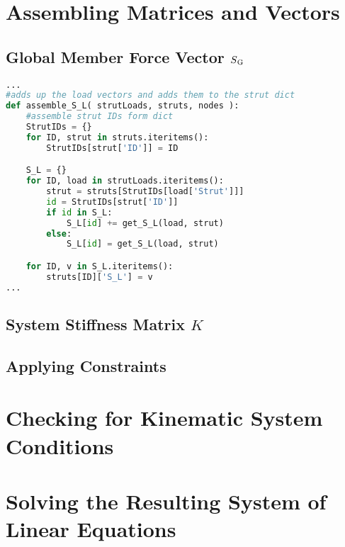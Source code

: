 \section{Assembling Matrices and Vectors}
\label{sec:asmmatrvec}



\subsection{Global Member Force Vector $S\textsubscript{G}$}
\label{sec:asmSGZ}

\begin{inconsolata}
\begin{minipage}{\linewidth}
\begin{lstlisting}[language=python]
...
#adds up the load vectors and adds them to the strut dict
def assemble_S_L( strutLoads, struts, nodes ):
	#assemble strut IDs form dict
	StrutIDs = {}
	for ID, strut in struts.iteritems():
		StrutIDs[strut['ID']] = ID

	S_L = {}
	for ID, load in strutLoads.iteritems():
		strut = struts[StrutIDs[load['Strut']]]
		id = StrutIDs[strut['ID']]
		if id in S_L:
			S_L[id] += get_S_L(load, strut)
		else:
			S_L[id] = get_S_L(load, strut)

	for ID, v in S_L.iteritems():
		struts[ID]['S_L'] = v
...
\end{lstlisting}
\end{minipage}
\end{inconsolata}

\subsection{System Stiffness Matrix $K$}
\label{sec:asmK}



\subsection{Applying Constraints}
\label{sec:applyconst}


\section{Checking for Kinematic System Conditions}
\label{sec:kinesyscheck}


\section{Solving the Resulting System of Linear Equations}
\label{sec:solver}

